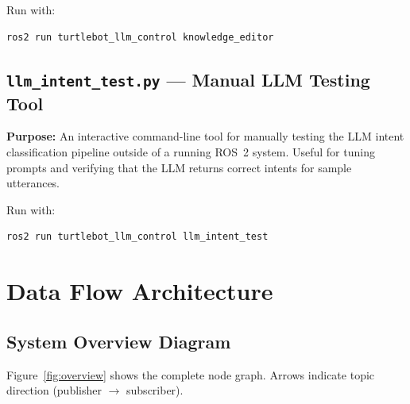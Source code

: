 \documentclass[12pt,a4paper]{report}
\begin{document}
Run with:
\begin{lstlisting}[style=bashstyle]
ros2 run turtlebot_llm_control knowledge_editor
\end{lstlisting}

\section{\texttt{llm\_intent\_test.py} — Manual LLM Testing Tool}

\textbf{Purpose:} An interactive command-line tool for manually testing the
LLM intent classification pipeline outside of a running ROS~2 system.  Useful
for tuning prompts and verifying that the LLM returns correct intents for
sample utterances.

Run with:
\begin{lstlisting}[style=bashstyle]
ros2 run turtlebot_llm_control llm_intent_test
\end{lstlisting}

\chapter{Data Flow Architecture}
\label{ch:dataflow}

\section{System Overview Diagram}

Figure~\ref{fig:overview} shows the complete node graph.  Arrows indicate
topic direction (publisher $\rightarrow$ subscriber).
\end{document}
